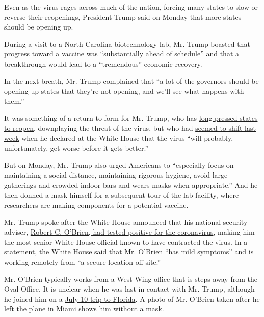 Even as the virus rages across much of the nation, forcing many states
to slow or reverse their reopenings, President Trump said on Monday that
more states should be opening up.

During a visit to a North Carolina biotechnology lab, Mr. Trump boasted
that progress toward a vaccine was ``substantially ahead of schedule''
and that a breakthrough would lead to a ``tremendous'' economic
recovery.

In the next breath, Mr. Trump complained that ``a lot of the governors
should be opening up states that they're not opening, and we'll see what
happens with them.''

It was something of a return to form for Mr. Trump, who has
\href{https://www.nytimes.com/2020/04/17/us/politics/trump-coronavirus-governors.html}{long
pressed states to reopen}, downplaying the threat of the virus, but who
had
\href{https://www.nytimes.com/2020/07/21/us/politics/trump-coronavirus-masks.html}{seemed
to shift last week} when he declared at the White House that the virus
``will probably, unfortunately, get worse before it gets better.''

But on Monday, Mr. Trump also urged Americans to ``especially focus on
maintaining a social distance, maintaining rigorous hygiene, avoid large
gatherings and crowded indoor bars and wears masks when appropriate.''
And he then donned a mask himself for a subsequent tour of the lab
facility, where researchers are making components for a potential
vaccine.

Mr. Trump spoke after the White House announced that his national
security adviser,
\href{https://www.nytimes.com/2020/07/27/us/politics/robert-obrien-virus.html}{Robert
C. O'Brien, had tested positive for the coronavirus}, making him the
most senior White House official known to have contracted the virus. In
a statement, the White House said that Mr. O'Brien ``has mild symptoms''
and is working remotely from ``a secure location off site.''

Mr. O'Brien typically works from a West Wing office that is steps away
from the Oval Office. It is unclear when he was last in contact with Mr.
Trump, although he joined him on a
\href{https://www.nytimes.com/2020/07/10/us/politics/trump-florida-maduro.html}{July
10 trip to Florida}. A photo of Mr. O'Brien taken after he left the
plane in Miami shows him without a mask.

\href{https://www.nytimes.com/interactive/2020/07/27/upshot/coronavirus-pooled-testing.html}{}


